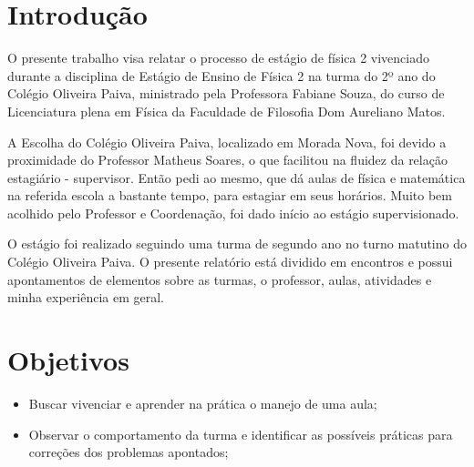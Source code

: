 \documentclass[a4paper, 12 pt]{article}                                	%
\begin{document}
	\newpage
	\tableofcontents                         %
	\thispagestyle{empty}
	
	
	\newpage                                 %
	
	
	
	\section{Introdução}
	\label{sec:introducao}
	
	O presente trabalho visa relatar o processo de estágio de física 2 vivenciado
	durante a disciplina de Estágio de Ensino de Física 2 na turma do 2º ano do Colégio Oliveira Paiva, ministrado pela Professora Fabiane Souza, do curso de Licenciatura plena em Física da Faculdade de Filosofia Dom Aureliano Matos.
	
	A Escolha do Colégio Oliveira Paiva, localizado em Morada Nova, foi devido a proximidade do Professor Matheus Soares, o que facilitou na fluidez da relação estagiário - supervisor. Então pedi ao mesmo, que dá aulas de física e matemática na referida escola a bastante tempo, para estagiar em seus horários. Muito bem acolhido pelo Professor e Coordenação, foi dado início ao estágio supervisionado.
	
	O estágio foi realizado seguindo uma turma de segundo ano no turno matutino do Colégio Oliveira Paiva. O presente relatório está dividido em encontros e possui apontamentos de elementos sobre as turmas, o professor, aulas, atividades e minha experiência em geral.
	
	\section{Objetivos}
	
	\begin{itemize}   %
		
		\item Buscar vivenciar e aprender na prática o manejo de uma aula;
		\item Observar o comportamento da turma e identificar as possíveis práticas para correções dos problemas apontados;
	\end{itemize}
	
	
	\
	
\end{document}
